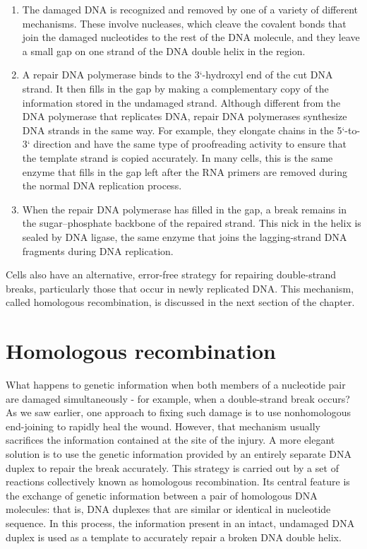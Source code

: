 \begin{enumerate}
\item The damaged DNA is recognized and removed by one of a variety
of different mechanisms. These involve nucleases, which cleave
the covalent bonds that join the damaged nucleotides to the rest of
the DNA molecule, and they leave a small gap on one strand of the
DNA double helix in the region.
\item A repair DNA polymerase binds to the 3`-hydroxyl end of the cut
DNA strand. It then fills in the gap by making a complementary
copy of the information stored in the undamaged strand. Although
different from the DNA polymerase that replicates DNA, repair
DNA polymerases synthesize DNA strands in the same way. For
example, they elongate chains in the 5`-to-3` direction and have
the same type of proofreading activity to ensure that the template
strand is copied accurately. In many cells, this is the same enzyme
that fills in the gap left after the RNA primers are removed during
the normal DNA replication process.
\item When the repair DNA polymerase has filled in the gap, a break
remains in the sugar–phosphate backbone of the repaired strand.
This nick in the helix is sealed by DNA ligase, the same enzyme that
joins the lagging-strand DNA fragments during DNA replication.
\end{enumerate}

Cells also have an alternative, error-free strategy for repairing double-strand
breaks, particularly those that occur in newly replicated DNA. This
mechanism, called homologous recombination, is discussed in the next
section of the chapter.

\section{Homologous recombination}

What happens to genetic information when both members of a
nucleotide pair are damaged simultaneously - for example, when a
double-strand break occurs? As we saw earlier, one approach to fixing
such damage is to use nonhomologous end-joining to rapidly heal the
wound. However, that mechanism usually sacrifices the information
contained at the site of the injury. A more elegant solution is to use the
genetic information provided by an entirely separate DNA duplex to repair
the break accurately. This strategy is carried out by a set of reactions
collectively known as homologous recombination. Its central feature
is the exchange of genetic information between a pair of homologous
DNA molecules: that is, DNA duplexes that are similar or identical
in nucleotide sequence. In this process, the information present in an
intact, undamaged DNA duplex is used as a template to accurately repair
a broken DNA double helix.

